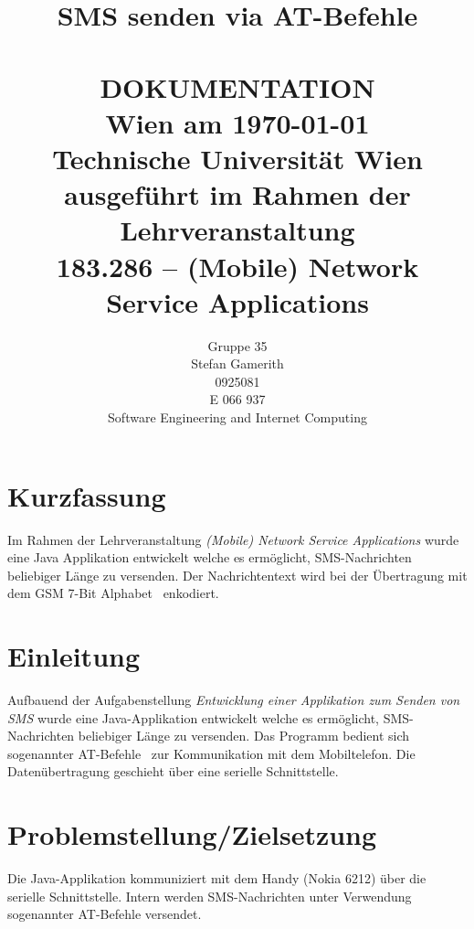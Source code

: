 \documentclass[paper=a4, fontsize=11pt]{scrartcl}
\title{	\Large SMS senden via AT-Befehle%
	\\[2.0cm] \HRule{0.5pt} \\
	\LARGE \textbf{\uppercase{Dokumentation}} %
	\HRule{2pt} \\[1.5cm]
	\normalsize Wien am \today \\
	\normalsize Technische Universität Wien \\[1.0cm]
	\normalsize ausgeführt im Rahmen der Lehrveranstaltung \\
	\LARGE 183.286 – (Mobile) Network Service Applications
}
\author{
	Gruppe 35 \\[2.0cm]
	Stefan Gamerith \\
	0925081 \\
	E 066 937 \\
	Software Engineering and Internet Computing \\[2.0cm]
}
\makeatletter
\def\printtitle{%
	{\centering \@title\par}}
\def\printauthor{%
	{\centering \normalsize \@author}}
\makeatother
\begin{document}
\thispagestyle{empty} %
\printtitle
	\vfill
\printauthor
\newpage
\section*{Kurzfassung}
Im Rahmen der Lehrveranstaltung \textit{(Mobile) Network Service Applications} wurde eine 
Java Applikation entwickelt welche es ermöglicht, SMS-Nachrichten beliebiger Länge
zu versenden. Der Nachrichtentext wird bei der Übertragung mit dem GSM 7-Bit 
Alphabet~\cite{gsm-7-bit} enkodiert. 
\newpage
\tableofcontents
\newpage
\newpage
\listoftables
\listoffigures
\newpage
\section{Einleitung}
Aufbauend der Aufgabenstellung \textit{Entwicklung einer Applikation zum
Senden von SMS} wurde eine Java-Applikation entwickelt welche es ermöglicht, 
SMS-Nachrichten beliebiger Länge zu versenden. Das Programm bedient sich
sogenannter AT-Befehle~\cite{at-befehle} zur Kommunikation mit dem Mobiltelefon.
Die Datenübertragung geschieht über eine serielle Schnittstelle.

\section{Problemstellung/Zielsetzung}
Die Java-Applikation kommuniziert mit dem Handy (Nokia 6212) über die serielle
Schnittstelle. Intern werden SMS-Nachrichten unter Verwendung sogenannter AT-Befehle
versendet.
\end{document}
